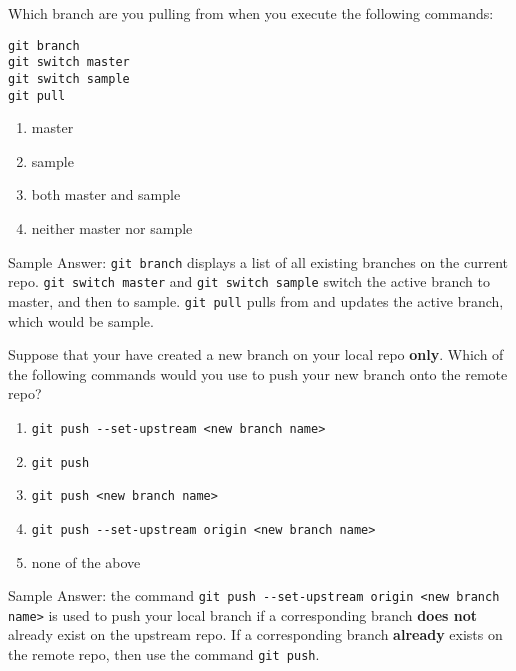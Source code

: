 \documentclass[12pt,fleqn]{examtst}
\begin{document}

\newpage
\noindent
\begin{minipage}{\textwidth}

Which branch are you pulling from when you execute the following commands:

\begin{lstlisting}
git branch
git switch master
git switch sample
git pull
\end{lstlisting}

\begin{enumerate}
    \item master
    \item sample \marker
    \item both master and sample
    \item neither master nor sample
\end{enumerate}
Sample Answer: \lstinline{git branch} displays a list of all existing branches on the current repo. \lstinline{git switch master} and \lstinline{git switch sample} switch the active branch to master, and then to sample. \lstinline{git pull} pulls from and updates the active branch, which would be sample.

Suppose that your have created a new branch on your local repo \textbf{only}. Which of the following commands would you use to push your new branch onto the remote repo?

\begin{enumerate}
    \item \lstinline{git push --set-upstream <new branch name>}
    \item \lstinline{git push}
    \item \lstinline{git push <new branch name>}
    \item \lstinline{git push --set-upstream origin <new branch name>} \marker
    \item none of the above
\end{enumerate}
Sample Answer: the command \lstinline{git push --set-upstream origin <new branch name>} is used to push your local branch if a corresponding branch \textbf{does not} already exist on the upstream repo. If a corresponding branch \textbf{already} exists on the remote repo, then use the command \lstinline{git push}.

\end{minipage}
\end{document}
